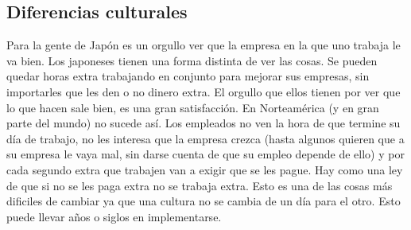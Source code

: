 	\subsection{Diferencias culturales}
	Para la gente de Jap\'on es un orgullo ver que la empresa en la que uno trabaja le va bien. Los japoneses tienen una forma distinta de ver las cosas. Se pueden quedar horas extra trabajando en conjunto para mejorar sus empresas, sin importarles que les den o no dinero extra. El orgullo que ellos tienen por ver que lo que hacen sale bien, es una gran satisfacci\'on. En Norteam\'erica (y en gran parte del mundo) no sucede así. Los empleados no ven la hora de que termine su día de trabajo, no les interesa que la empresa crezca (hasta algunos quieren que a su empresa le vaya mal, sin darse cuenta de que su empleo depende de ello) y por cada segundo extra que trabajen van a exigir que se les pague. Hay como una ley de que si no se les paga extra no se trabaja extra. Esto es una de las cosas m\'as dificiles de cambiar ya que una cultura no se cambia de un día para el otro. Esto puede llevar a\~nos o siglos en implementarse.